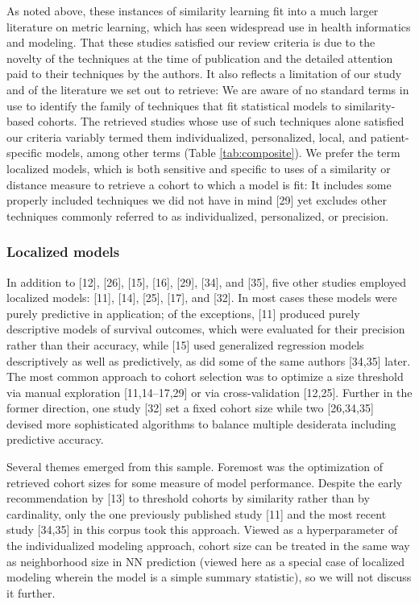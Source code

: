 \documentclass[preprint, 3p,
authoryear]{elsarticle} %
\begin{document}
As noted above, these instances of similarity learning fit into a much
larger literature on metric learning, which has seen widespread use in
health informatics and modeling. That these studies satisfied our review
criteria is due to the novelty of the techniques at the time of
publication and the detailed attention paid to their techniques by the
authors. It also reflects a limitation of our study and of the
literature we set out to retrieve: We are aware of no standard terms in
use to identify the family of techniques that fit statistical models to
similarity-based cohorts. The retrieved studies whose use of such
techniques alone satisfied our criteria variably termed them
individualized, personalized, local, and patient-specific models, among
other terms (Table \ref{tab:composite}). We prefer the term localized
models, which is both sensitive and specific to uses of a similarity or
distance measure to retrieve a cohort to which a model is fit: It
includes some properly included techniques we did not have in mind
{[}29{]} yet excludes other techniques commonly referred to as
individualized, personalized, or precision.

\hypertarget{localized-models}{%
\subsubsection{Localized models}\label{localized-models}}

In addition to {[}12{]}, {[}26{]}, {[}15{]}, {[}16{]}, {[}29{]},
{[}34{]}, and {[}35{]}, five other studies employed localized models:
{[}11{]}, {[}14{]}, {[}25{]}, {[}17{]}, and {[}32{]}. In most cases
these models were purely predictive in application; of the exceptions,
{[}11{]} produced purely descriptive models of survival outcomes, which
were evaluated for their precision rather than their accuracy, while
{[}15{]} used generalized regression models descriptively as well as
predictively, as did some of the same authors {[}34,35{]} later. The
most common approach to cohort selection was to optimize a size
threshold via manual exploration {[}11,14--17,29{]} or via
cross-validation {[}12,25{]}. Further in the former direction, one study
{[}32{]} set a fixed cohort size while two {[}26,34,35{]} devised more
sophisticated algorithms to balance multiple desiderata including
predictive accuracy.

Several themes emerged from this sample. Foremost was the optimization
of retrieved cohort sizes for some measure of model performance. Despite
the early recommendation by {[}13{]} to threshold cohorts by similarity
rather than by cardinality, only the one previously published study
{[}11{]} and the most recent study {[}34,35{]} in this corpus took this
approach. Viewed as a hyperparameter of the individualized modeling
approach, cohort size can be treated in the same way as neighborhood
size in NN prediction (viewed here as a special case of localized
modeling wherein the model is a simple summary statistic), so we will
not discuss it further.
\end{document}
